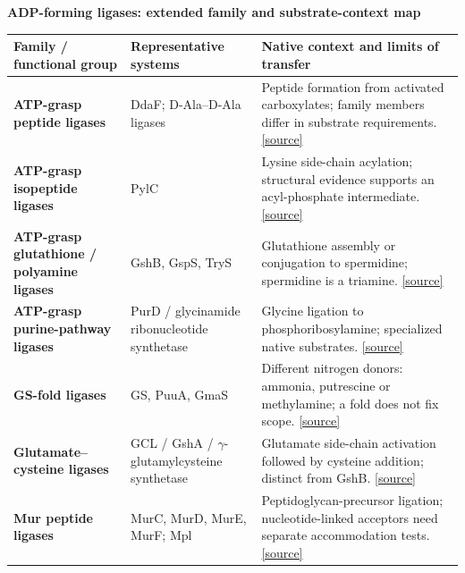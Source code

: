 \documentclass{article}
\begin{document}
{\fontsize{27}{32}\selectfont\bfseries\color{maroon} ADP-forming ligases: extended family and substrate-context map\par}
\par\vspace{16pt}
\fontsize{16}{20}\selectfont
\begin{tabularx}{\textwidth}{@{}>{\raggedright\arraybackslash}p{3.9in}>{\raggedright\arraybackslash}p{3.25in}Y@{}}
\toprule{}\textbf{Family / functional group} & \textbf{Representative systems} & \textbf{Native context and limits of transfer}\\\midrule
\textbf{ATP-grasp peptide ligases} & DdaF; D-Ala--D-Ala ligases & Peptide formation from activated carboxylates; family members differ in substrate requirements. \href{https://doi.org/10.1021/bi9013165}{[source]} \\[5pt]
\textbf{ATP-grasp isopeptide ligases} & PylC & Lysine side-chain acylation; structural evidence supports an acyl-phosphate intermediate. \href{https://doi.org/10.1016/j.jmb.2012.09.007}{[source]} \\[5pt]
\textbf{ATP-grasp glutathione / polyamine ligases} & GshB, GspS, TryS & Glutathione assembly or conjugation to spermidine; spermidine is a triamine. \href{https://pmc.ncbi.nlm.nih.gov/articles/PMC1698887/}{[source]} \\[5pt]
\textbf{ATP-grasp purine-pathway ligases} & PurD / glycinamide ribonucleotide synthetase & Glycine ligation to phosphoribosylamine; specialized native substrates. \href{https://www.rcsb.org/structure/1GSO}{[source]} \\[5pt]
\textbf{GS-fold ligases} & GS, PuuA, GmaS & Different nitrogen donors: ammonia, putrescine or methylamine; a fold does not fix scope. \href{https://pubmed.ncbi.nlm.nih.gov/18495664/}{[source]} \\[5pt]
\textbf{Glutamate--cysteine ligases} & GCL / GshA / $\gamma$-glutamylcysteine synthetase & Glutamate side-chain activation followed by cysteine addition; distinct from GshB. \href{https://pmc.ncbi.nlm.nih.gov/articles/PMC523444/}{[source]} \\[5pt]
\textbf{Mur peptide ligases} & MurC, MurD, MurE, MurF; Mpl & Peptidoglycan-precursor ligation; nucleotide-linked acceptors need separate accommodation tests. \href{https://www.rcsb.org/annotations/1P3D}{[source]} \\[5pt]

\end{tabularx}
\end{document}
